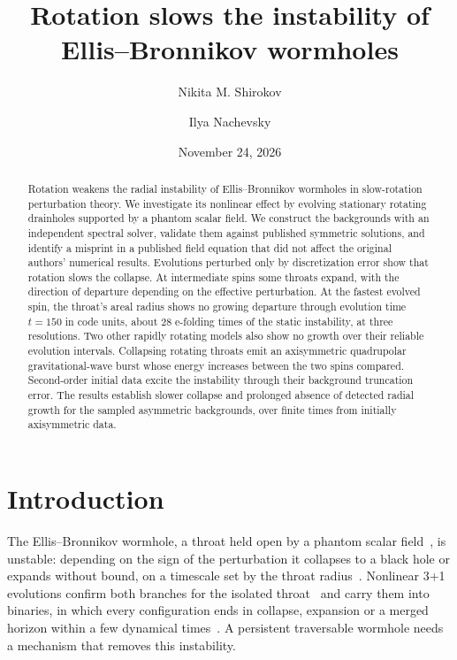 \documentclass[twocolumn,floatfix,aps,prd,superscriptaddress,nofootinbib]{revtex4-2}
\begin{document}
\raggedbottom

\title{Rotation slows the instability of Ellis--Bronnikov wormholes}

\author{Nikita M. Shirokov}
\author{Ilya Nachevsky}
\date{November 24, 2026}

\begin{abstract}
Rotation weakens the radial instability of Ellis--Bronnikov wormholes in slow-rotation perturbation theory. We investigate its nonlinear effect by evolving stationary rotating drainholes supported by a phantom scalar field. We construct the backgrounds with an independent spectral solver, validate them against published symmetric solutions, and identify a misprint in a published field equation that did not affect the original authors' numerical results. Evolutions perturbed only by discretization error show that rotation slows the collapse. At intermediate spins some throats expand, with the direction of departure depending on the effective perturbation. At the fastest evolved spin, the throat's areal radius shows no growing departure through evolution time $t=150$ in code units, about 28 e-folding times of the static instability, at three resolutions. Two other rapidly rotating models also show no growth over their reliable evolution intervals. Collapsing rotating throats emit an axisymmetric quadrupolar gravitational-wave burst whose energy increases between the two spins compared. Second-order initial data excite the instability through their background truncation error. The results establish slower collapse and prolonged absence of detected radial growth for the sampled asymmetric backgrounds, over finite times from initially axisymmetric data.
\end{abstract}

\maketitle

\section{Introduction}
\label{sec:intro}

The Ellis--Bronnikov wormhole, a throat held open by a phantom scalar field~\cite{ellis1973,bronnikov1973,morris_thorne1988,visser1995}, is unstable: depending on the sign of the perturbation it collapses to a black hole or expands without bound, on a timescale set by the throat radius~\cite{gonzalez2009lin,gonzalez2009,shinkai2002,bronnikov2011,cremona2019}. Nonlinear 3+1 evolutions confirm both branches for the isolated throat~\cite{shirokov2026} and carry them into binaries, in which every configuration ends in collapse, expansion or a merged horizon within a few dynamical times~\cite{shirokov2026c}. A persistent traversable wormhole needs a mechanism that removes this instability.
\end{document}
